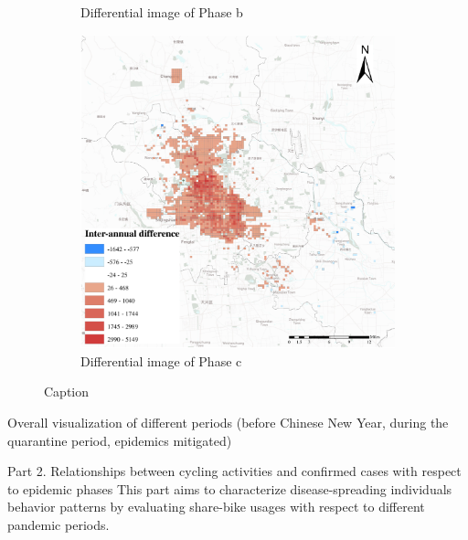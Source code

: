 \documentclass[preprints,ijgi,submit,moreauthors]{Definitions/mdpi}
\begin{document}
\begin{figure}[H]
\begin{subfigure}{.3\textwidth}
        \caption{Differential image of Phase b}
    \end{subfigure}
        \begin{subfigure}{.3\textwidth}
        \includegraphics[width=\textwidth]{Figures/BSSMinusmp3.eps}
        \caption{Differential image of Phase c}
    \end{subfigure}
    \caption{Caption}
    \label{fig:compare_2019_and_2020}
\end{figure}

Overall visualization of different periods (before Chinese New Year, during the quarantine period, epidemics mitigated)

Part 2. Relationships between cycling activities and confirmed cases with respect to epidemic phases
This part aims to characterize disease-spreading individuals behavior patterns by evaluating share-bike usages with respect to different pandemic periods.%
\end{document}
